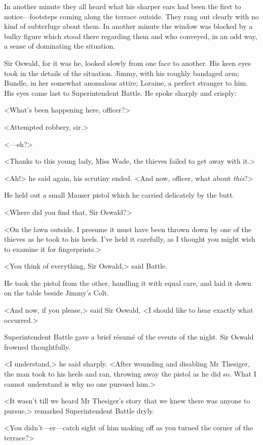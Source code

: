 In another minute they all heard what his sharper ears had been the first to notice—footsteps coming along the terrace outside. They rang out clearly with no kind of subterfuge about them. In another minute the window was blocked by a bulky figure which stood there regarding them and who conveyed, in an odd way, a sense of dominating the situation.

Sir Oswald, for it was he, looked slowly from one face to another. His keen eyes took in the details of the situation. Jimmy, with his roughly bandaged arm; Bundle, in her somewhat anomalous attire; Loraine, a perfect stranger to him. His eyes came last to Superintendent Battle. He spoke sharply and crisply:

<What's been happening here, officer?>

<Attempted robbery, sir.>

<—eh?>

<Thanks to this young lady, Miss Wade, the thieves failed to get away with it.>

<Ah!> he said again, his scrutiny ended. <And now, officer, what about \emph{this}?>

He held out a small Mauser pistol which he carried delicately by the butt.

<Where did you find that, Sir Oswald?>

<On the lawn outside. I presume it must have been thrown down by one of the thieves as he took to his heels. I've held it carefully, as I thought you might wish to examine it for fingerprints.>

<You think of everything, Sir Oswald,> said Battle.

He took the pistol from the other, handling it with equal care, and laid it down on the table beside Jimmy's Colt.

<And now, if you please,> said Sir Oswald, <I should like to hear exactly what occurred.>

Superintendent Battle gave a brief résumé of the events of the night. Sir Oswald frowned thoughtfully.

<I understand,> he said sharply. <After wounding and disabling Mr Thesiger, the man took to his heels and ran, throwing away the pistol as he did so. What I cannot understand is why no one pursued him.>

<It wasn't till we heard Mr Thesiger's story that we knew there was anyone to pursue,> remarked Superintendent Battle dryly.

<You didn't—er—catch sight of him making off as you turned the corner of the terrace?>


